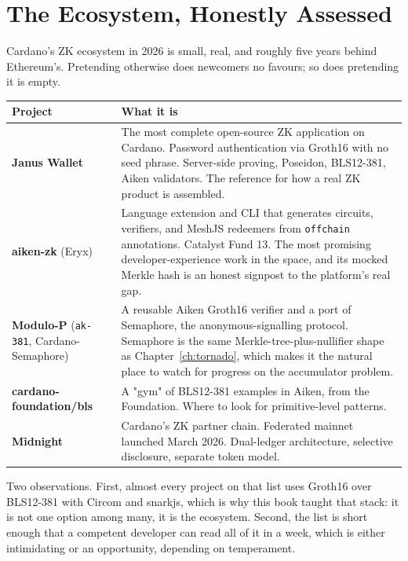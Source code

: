 \section{The Ecosystem, Honestly Assessed} \label{sec:ch9-ecosystem}

Cardano's ZK ecosystem in 2026 is small, real, and roughly five years behind
Ethereum's. Pretending otherwise does newcomers no favours; so does pretending
it is empty.

\begin{center}
\begin{tabular}{p{3.6cm}p{8.4cm}}
  \hline
  \textbf{Project} & \textbf{What it is} \\
  \hline
  \textbf{Janus Wallet}
    & The most complete open-source ZK application on Cardano. Password
      authentication via Groth16 with no seed phrase. Server-side proving,
      Poseidon, BLS12-381, Aiken validators. The reference for how a real ZK
      product is assembled. \\
  \addlinespace
  \textbf{aiken-zk} (Eryx)
    & Language extension and CLI that generates circuits, verifiers, and
      MeshJS redeemers from \texttt{offchain} annotations. Catalyst Fund 13.
      The most promising developer-experience work in the space, and its
      mocked Merkle hash is an honest signpost to the platform's real gap. \\
  \addlinespace
  \textbf{Modulo-P} (\texttt{ak-381}, Cardano-Semaphore)
    & A reusable Aiken Groth16 verifier and a port of Semaphore, the
      anonymous-signalling protocol. Semaphore is the same
      Merkle-tree-plus-nullifier shape as Chapter~\ref{ch:tornado}, which makes
      it the natural place to watch for progress on the accumulator problem. \\
  \addlinespace
  \textbf{cardano-foundation/bls}
    & A "gym" of BLS12-381 examples in Aiken, from the Foundation. Where to
      look for primitive-level patterns. \\
  \addlinespace
  \textbf{Midnight}
    & Cardano's ZK partner chain. Federated mainnet launched March 2026.
      Dual-ledger architecture, selective disclosure, separate token model. \\
  \hline
\end{tabular}
\end{center}

Two observations. First, almost every project on that list uses Groth16 over
BLS12-381 with Circom and snarkjs, which is why this book taught that stack: it
is not one option among many, it is the ecosystem. Second, the list is short
enough that a competent developer can read all of it in a week, which is
either intimidating or an opportunity, depending on temperament.

